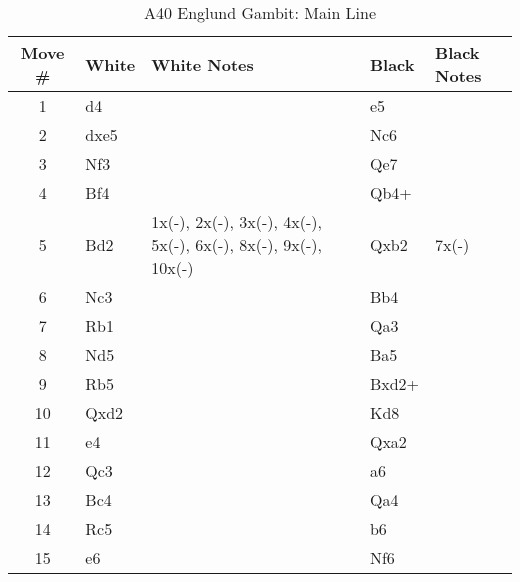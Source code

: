 \begin{table}[htbp]
\centering
\scriptsize
\caption[]{A40 Englund Gambit: Main Line}
\begin{tabular}{|c|l|p{5cm}|l|p{5cm}|}
\hline
\textbf{Move \#} & \textbf{White} & \textbf{White Notes} & \textbf{Black} & \textbf{Black Notes} \\
\hline
1  & d4    &                     & e5    &                        \\
2  & dxe5  &                     & Nc6   &                        \\
3  & Nf3   &                     & Qe7   &                        \\
4  & Bf4   &                     & Qb4+  &                        \\
5  & Bd2   & 1x(-), 2x(-), 3x(-), 4x(-), 5x(-), 6x(-), 8x(-), 9x(-), 10x(-) & Qxb2  & 7x(-) \\
6  & Nc3   &                     & Bb4   &                        \\
7  & Rb1   &                     & Qa3   &                        \\
8  & Nd5   &                     & Ba5   &                        \\
9  & Rb5   &                     & Bxd2+ &                        \\
10 & Qxd2  &                     & Kd8   &                        \\
11 & e4    &                     & Qxa2  &                        \\
12 & Qc3   &                     & a6    &                        \\
13 & Bc4   &                     & Qa4   &                        \\
14 & Rc5   &                     & b6    &                        \\
15 & e6    &                     & Nf6   &                        \\
\hline
\end{tabular}
\end{table}


